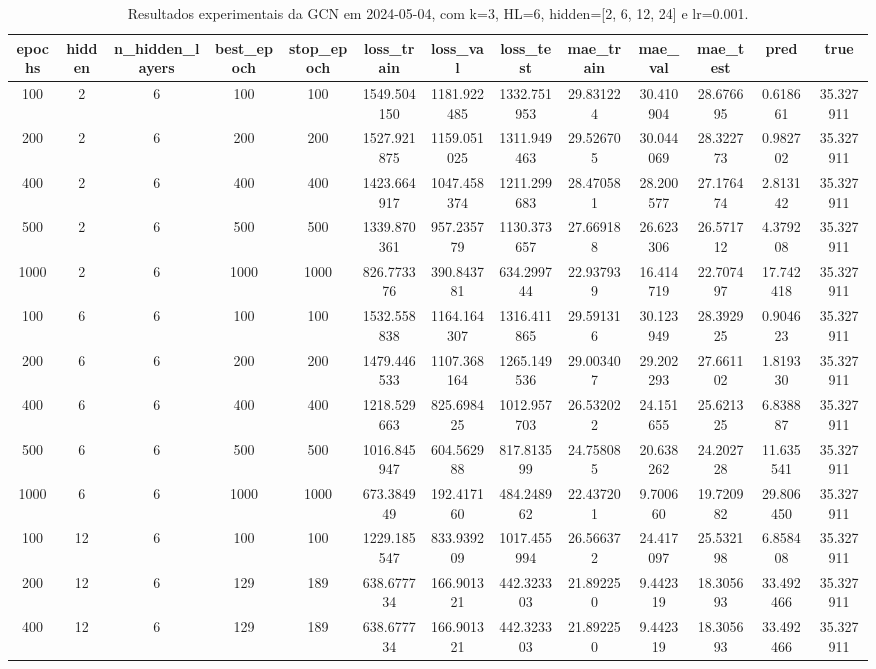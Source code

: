 \begin{table}[h]
\centering
\caption{Resultados experimentais da GCN em 2024-05-04, com k=3, HL=6, hidden=[2, 6, 12, 24] e lr=0.001.}
\label{tab:gcn_results_k3_hl6_d20240504}
\begin{tabular}{ccccccccccccc}
\toprule
epochs & hidden & n\_hidden\_layers & best\_epoch & stop\_epoch & loss\_train & loss\_val & loss\_test & mae\_train & mae\_val & mae\_test & pred & true \\
\midrule
100 & 2 & 6 & 100 & 100 & 1549.504150 & 1181.922485 & 1332.751953 & 29.831224 & 30.410904 & 28.676695 & 0.618661 & 35.327911 \\
200 & 2 & 6 & 200 & 200 & 1527.921875 & 1159.051025 & 1311.949463 & 29.526705 & 30.044069 & 28.322773 & 0.982702 & 35.327911 \\
400 & 2 & 6 & 400 & 400 & 1423.664917 & 1047.458374 & 1211.299683 & 28.470581 & 28.200577 & 27.176474 & 2.813142 & 35.327911 \\
500 & 2 & 6 & 500 & 500 & 1339.870361 & 957.235779 & 1130.373657 & 27.669188 & 26.623306 & 26.571712 & 4.379208 & 35.327911 \\
1000 & 2 & 6 & 1000 & 1000 & 826.773376 & 390.843781 & 634.299744 & 22.937939 & 16.414719 & 22.707497 & 17.742418 & 35.327911 \\
100 & 6 & 6 & 100 & 100 & 1532.558838 & 1164.164307 & 1316.411865 & 29.591316 & 30.123949 & 28.392925 & 0.904623 & 35.327911 \\
200 & 6 & 6 & 200 & 200 & 1479.446533 & 1107.368164 & 1265.149536 & 29.003407 & 29.202293 & 27.661102 & 1.819330 & 35.327911 \\
400 & 6 & 6 & 400 & 400 & 1218.529663 & 825.698425 & 1012.957703 & 26.532022 & 24.151655 & 25.621325 & 6.838887 & 35.327911 \\
500 & 6 & 6 & 500 & 500 & 1016.845947 & 604.562988 & 817.813599 & 24.758085 & 20.638262 & 24.202728 & 11.635541 & 35.327911 \\
1000 & 6 & 6 & 1000 & 1000 & 673.384949 & 192.417160 & 484.248962 & 22.437201 & 9.700660 & 19.720982 & 29.806450 & 35.327911 \\
100 & 12 & 6 & 100 & 100 & 1229.185547 & 833.939209 & 1017.455994 & 26.566372 & 24.417097 & 25.532198 & 6.858408 & 35.327911 \\
200 & 12 & 6 & 129 & 189 & 638.677734 & 166.901321 & 442.323303 & 21.892250 & 9.442319 & 18.305693 & 33.492466 & 35.327911 \\
400 & 12 & 6 & 129 & 189 & 638.677734 & 166.901321 & 442.323303 & 21.892250 & 9.442319 & 18.305693 & 33.492466 & 35.327911 \\

\end{tabular}
\end{table}
